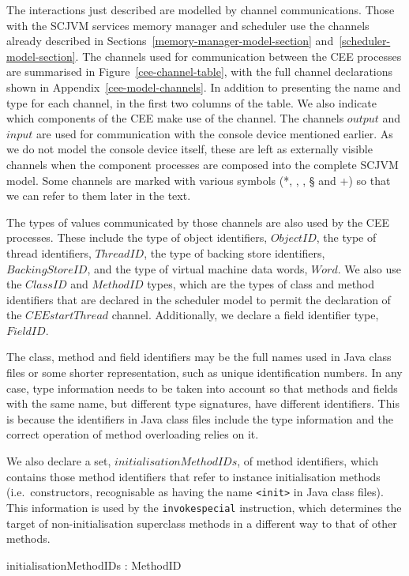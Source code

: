 The interactions just described are modelled by channel
communications.
Those with the SCJVM services memory manager and scheduler use the
channels already described in
Sections~\ref{memory-manager-model-section}
and~\ref{scheduler-model-section}.
The channels used for communication between the CEE processes are
summarised in Figure~\ref{cee-channel-table}, with the full channel
declarations shown in Appendix~\ref{cee-model-channels}.
In addition to presenting the name and type for each channel, in the
first two columns of the table.
We also indicate which components of the CEE make use of the channel.
The channels $output$ and $input$ are used for communication with the
console device mentioned earlier.
As we do not model the console device itself, these are left as
externally visible channels when the component processes are composed
into the complete SCJVM model.
Some channels are marked with various symbols (*, \dag{}, \ddag{},
\S{} and {}+{}) so that we can refer to them later in the text.

The types of values communicated by those channels are also used by
the CEE processes.
These include the type of object identifiers, $ObjectID$, the type of
thread identifiers, $ThreadID$, the type of backing store identifiers,
$BackingStoreID$, and the type of virtual machine data words, $Word$.
We also use the $ClassID$ and $MethodID$ types, which are the types of
class and method identifiers that are declared in the scheduler model
to permit the declaration of the $CEEstartThread$ channel.
Additionally, we declare a field identifier type, $FieldID$.
\begin{zed}
  [FieldID]
\end{zed}
The class, method and field identifiers may be the full names used in
Java class files or some shorter representation, such as unique
identification numbers.
In any case, type information needs to be taken into account so that
methods and fields with the same name, but different type signatures,
have different identifiers.
This is because the identifiers in Java class files include the type
information and the correct operation of method overloading relies on
it.

We also declare a set, $initialisationMethodIDs$, of method
identifiers, which contains those method identifiers that refer to
instance initialisation methods (i.e.\ constructors, recognisable as
having the name \texttt{\textless{}init\textgreater{}} in Java class
files).
This information is used by the \texttt{invokespecial} instruction,
which determines the target of non-initialisation superclass methods
in a different way to that of other methods.
\begin{axdef}
	initialisationMethodIDs : \power MethodID
\end{axdef}

